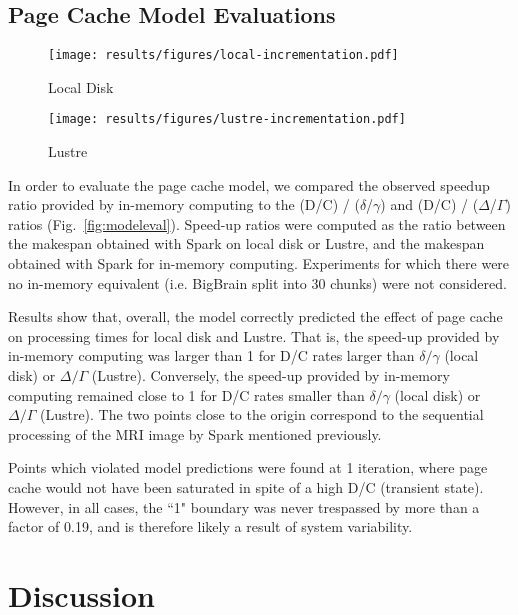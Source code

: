 \documentclass{IEEEtran}
\begin{document}
\subsection{Page Cache Model Evaluations}
\begin{figure*}
\begin{subfigure}{0.5\linewidth}
\centering
    \texttt{[image: results/figures/local-incrementation.pdf]}
\caption{Local Disk}
\label{fig:modeleval-local}
    \end{subfigure}%
\begin{subfigure}{0.5\linewidth}
\centering
    \texttt{[image: results/figures/lustre-incrementation.pdf]}
\caption{Lustre}
\label{fig:modeleval-lustre}
\end{subfigure}
\setlength{\belowcaptionskip}{-10pt}
    \caption{Page cache model evaluation. Grey 
             regions denote areas that violate model predictions.}
\label{fig:modeleval}
\end{figure*}

In order to evaluate the page cache model, we compared the observed 
speedup ratio provided by in-memory computing to the (D/C) / 
($\delta$/$\gamma$) and (D/C) / ($\Delta$/$\Gamma$) ratios 
(Fig.~\ref{fig:modeleval}). Speed-up ratios were computed as the ratio 
between the makespan obtained with Spark on local disk or Lustre, and 
the makespan obtained with Spark for in-memory computing. Experiments 
for which there were no in-memory equivalent (i.e. BigBrain split into 
30 
chunks) 
were not considered.

Results show that, overall, the model correctly predicted the effect of 
page cache on processing times for local disk and Lustre. That is, the 
speed-up provided by in-memory computing was larger than 1 for D/C 
rates larger than $\delta/\gamma$ (local disk) or $\Delta/\Gamma$ 
(Lustre). Conversely, the speed-up provided by in-memory computing 
remained close to 1 for D/C rates smaller than $\delta/\gamma$ (local 
disk) or $\Delta/\Gamma$ (Lustre). The two points close to the origin 
correspond to the sequential processing of the MRI image by Spark 
mentioned previously.

Points which violated 
model predictions were found at 1 iteration, where page cache would not 
have been saturated in spite of a high D/C (transient state). However, 
in all cases, the ``1" boundary was never trespassed by more than a 
factor of 0.19, and is therefore likely a result of system variability.

\section{Discussion} %
\label{sec:discussion}
\end{document}
